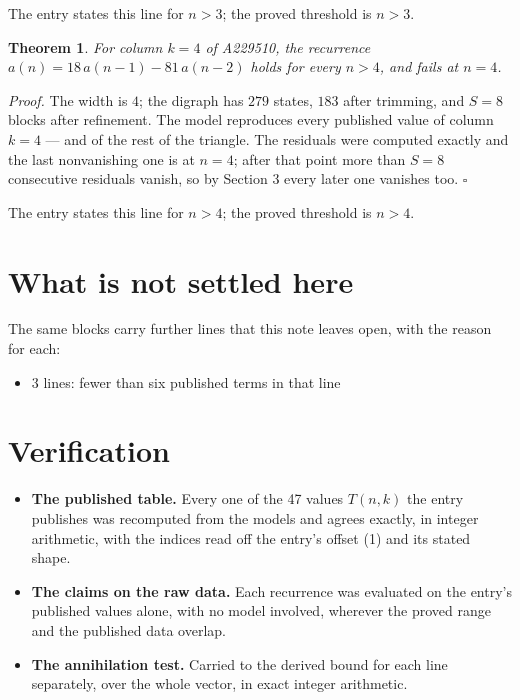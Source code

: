 \documentclass[11pt]{article}
\newtheorem{theorem}{Theorem}
\theoremstyle{definition}
\begin{document}
The entry states this line for $n > 3$; the proved threshold is $n > 3$.

\begin{theorem} For column $k = 4$ of A229510, the recurrence $a(n) = 18\,a(n-1) - 81\,a(n-2)$ holds for every $n > 4$, and fails at $n = 4$.\end{theorem}

{\itshape Proof.} The width is $4$; the digraph has $279$ states, $183$ after trimming, and $S = 8$ blocks after refinement. The model reproduces every published value of column $k = 4$ --- and of the rest of the triangle. The residuals were computed exactly and the last nonvanishing one is at $n = 4$; after that point more than $S = 8$ consecutive residuals vanish, so by Section 3 every later one vanishes too. $\square$

The entry states this line for $n > 4$; the proved threshold is $n > 4$.

\section{What is not settled here}

The same blocks carry further lines that this note leaves open, with the reason for each:

\begin{itemize}

\item 3 lines: fewer than six published terms in that line

\end{itemize}

\section{Verification}

\begin{itemize}

\item {\bfseries The published table.} Every one of the 47 values $T(n,k)$ the entry publishes was recomputed from the models and agrees exactly, in integer arithmetic, with the indices read off the entry's offset (1) and its stated shape.

\item {\bfseries The claims on the raw data.} Each recurrence was evaluated on the entry's published values alone, with no model involved, wherever the proved range and the published data overlap.

\item {\bfseries The annihilation test.} Carried to the derived bound for each line separately, over the whole vector, in exact integer arithmetic.

\end{itemize}
\end{document}
